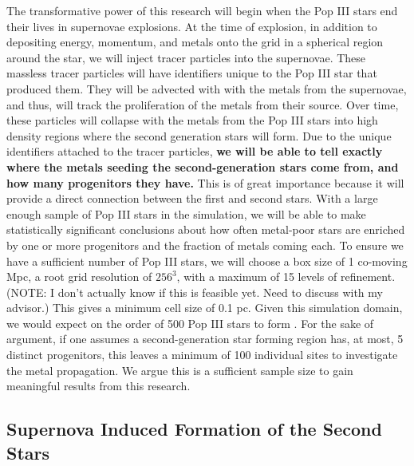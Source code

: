 \documentclass[12pt]{article}
\begin{document}
The transformative power of this research will begin when the Pop III stars end their lives in supernovae explosions. At the time of explosion, in addition to depositing energy, momentum, and metals onto the grid in a spherical region around the star, we will inject tracer particles into the supernovae. These massless tracer particles will have identifiers unique to the Pop III star that produced them. They will be advected with with the metals from the supernovae, and thus, will track the proliferation of the metals from their source. Over time, these particles will collapse with the metals from the Pop III stars into high density regions where the second generation stars will form. Due to the unique identifiers attached to the tracer particles, \textbf{we will be able to tell exactly where the metals seeding the second-generation stars come from, and how many progenitors they have.} This is of great importance because it will provide a direct connection between the first and second stars. With a large enough sample of Pop III stars in the simulation, we will be able to make statistically significant conclusions about how often metal-poor stars are enriched by one or more progenitors and the fraction of metals coming each. To ensure we have a sufficient number of Pop III stars, we will choose a box size of 1 co-moving Mpc, a root grid resolution of $256^3$, with a maximum of 15 levels of refinement. (NOTE: I don't actually know if this is feasible yet. Need to discuss with my advisor.) This gives a minimum cell size of 0.1 pc. Given this simulation domain, we would expect on the order of 500 Pop III stars to form \cite{...}. For the sake of argument, if one assumes a second-generation star forming region has, at most, 5 distinct progenitors, this leaves a minimum of 100 individual sites to investigate the metal propagation. We argue this is a sufficient sample size to gain meaningful results from this research.

\subsection{Supernova Induced Formation of the Second Stars}
\end{document}
